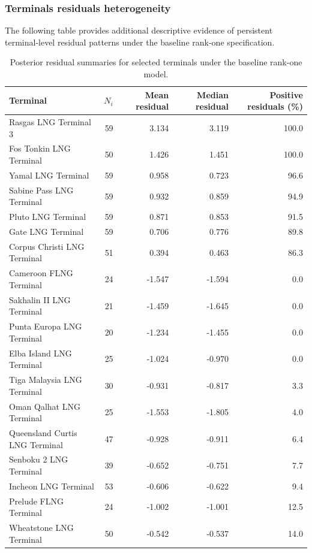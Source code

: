 \documentclass[pdftex,12pt,openright,a4paper,oneside]{book}
\begin{document}
\subsubsection{Terminals residuals heterogeneity}
\label{app:terminal_residual_heterogeneity}

The following table provides additional descriptive evidence
of persistent terminal-level residual patterns under
the baseline rank-one specification.

\begin{table}[htbp]
\centering
\caption{Posterior residual summaries for selected terminals under the baseline rank-one model.}
\label{tab:baseline_terminal_residuals}
\small
\begin{tabular}{lrrrr}
\toprule
Terminal & $N_i$ & Mean residual & Median residual & Positive residuals (\%) \\
\midrule
Rasgas LNG Terminal 3 & 59 & 3.134 & 3.119 & 100.0 \\
Fos Tonkin LNG Terminal & 50 & 1.426 & 1.451 & 100.0 \\
Yamal LNG Terminal & 59 & 0.958 & 0.723 & 96.6 \\
Sabine Pass LNG Terminal & 59 & 0.932 & 0.859 & 94.9 \\
Pluto LNG Terminal & 59 & 0.871 & 0.853 & 91.5 \\
Gate LNG Terminal & 59 & 0.706 & 0.776 & 89.8 \\
Corpus Christi LNG Terminal & 51 & 0.394 & 0.463 & 86.3 \\
\midrule
Cameroon FLNG Terminal & 24 & -1.547 & -1.594 & 0.0 \\
Sakhalin II LNG Terminal & 21 & -1.459 & -1.645 & 0.0 \\
Punta Europa LNG Terminal & 20 & -1.234 & -1.455 & 0.0 \\
Elba Island LNG Terminal & 25 & -1.024 & -0.970 & 0.0 \\
Tiga Malaysia LNG Terminal & 30 & -0.931 & -0.817 & 3.3 \\
Oman Qalhat LNG Terminal & 25 & -1.553 & -1.805 & 4.0 \\
Queensland Curtis LNG Terminal & 47 & -0.928 & -0.911 & 6.4 \\
Senboku 2 LNG Terminal & 39 & -0.652 & -0.751 & 7.7 \\
Incheon LNG Terminal & 53 & -0.606 & -0.622 & 9.4 \\
Prelude FLNG Terminal & 24 & -1.002 & -1.001 & 12.5 \\
Wheatstone LNG Terminal & 50 & -0.542 & -0.537 & 14.0 \\
\bottomrule
\end{tabular}


\end{table}
\end{document}
